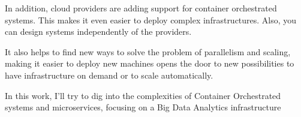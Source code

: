 In addition, cloud providers are adding support for container orchestrated systems. This makes it even easier to deploy complex infrastructures. Also, you can design systems independently of the providers. 

It also helps to find new ways to solve the problem of parallelism and scaling, making it easier to deploy new machines opens the door to new possibilities to have infrastructure on demand or to scale automatically.

In this work, I’ll try to dig into the complexities of Container Orchestrated systems and microservices, focusing on a Big Data Analytics infrastructure

 

